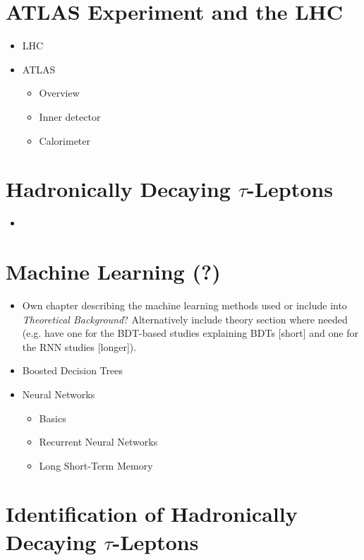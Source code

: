 \section{ATLAS Experiment and the LHC}

\begin{itemize}
\item LHC

\item ATLAS
  \begin{itemize}
  \item Overview
  \item Inner detector
  \item Calorimeter
  \end{itemize}
\end{itemize}

\section{Hadronically Decaying $\tau$-Leptons}

\begin{itemize}
\item
\end{itemize}

\section{Machine Learning (?)}

\begin{itemize}
\item Own chapter describing the machine learning methods used or include into
  \textit{Theoretical Background}? Alternatively include theory section where
  needed (e.g. have one for the BDT-based studies explaining BDTs [short] and
  one for the RNN studies [longer]).

\item Boosted Decision Trees

\item Neural Networks
  \begin{itemize}
  \item Basics
  \item Recurrent Neural Networks
  \item Long Short-Term Memory \cite{lstm}
  \end{itemize}

\end{itemize}

\section{Identification of Hadronically Decaying $\tau$-Leptons}

